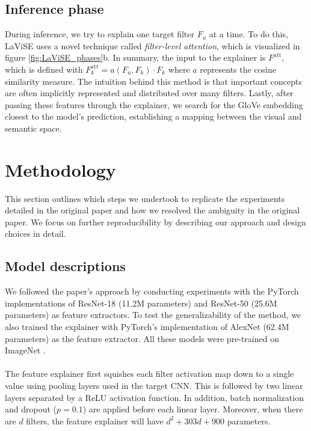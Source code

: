 \subsection{Inference phase} \label{sec:Inference phase}
During inference, we try to explain one target filter $F_u$ at a time. To do this, LaViSE uses a novel technique called \textit{filter-level attention}, which is visualized in figure \ref{fig:LaViSE_phases}b. In summary, the input to the explainer is $F^\text{att}$, which is defined with $F_k^\text{att} = a(F_u, F_k) \cdot F_k$ where $a$ represents the cosine similarity measure. The intuition behind this method is that important concepts are often implicitly represented and distributed over many filters. Lastly, after passing these features through the explainer, we search for the GloVe embedding closest to the model's prediction, establishing a mapping between the visual and semantic space.


\section{Methodology} \label{sec:Methodology}
This section outlines which steps we undertook to replicate the experiments detailed in the original paper and how we resolved the ambiguity in the original paper. We focus on further reproducibility by describing our approach and design choices in detail.

\subsection{Model descriptions} \label{sec:Model descriptions}
We followed the paper's approach by conducting experiments with the PyTorch \cite{paszke2019pytorch} implementations of ResNet-18 (11.2M parameters) and ResNet-50 (25.6M parameters) \cite{he2016deep} as feature extractors. To test the generalizability of the method, we also trained the explainer with PyTorch's implementation of AlexNet \cite{krizhevsky2017imagenet} (62.4M parameters) as the feature extractor. All these models were pre-trained on ImageNet \cite{deng2009imagenet}.
\\\\
The feature explainer first squishes each filter activation map down to a single value using pooling layers used in the target CNN. This is followed by two linear layers separated by a ReLU activation function. In addition, batch normalization and dropout ($p=0.1$) are applied before each linear layer. Moreover, when there are $d$ filters, the feature explainer will have $d^2 + 303d + 900$ parameters.


